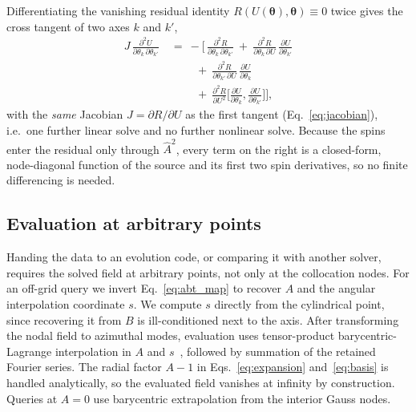 \documentclass[
  aps,
  prd,
  twocolumn,
  10pt,
  amsmath,
  amssymb,
  nofootinbib,
  superscriptaddress,
  floatfix,
]{revtex4-2}
\newcommand{\vect}[1]{\boldsymbol{#1}}
\newcommand{\Ahat}{\hat{A}}
\begin{document}
Differentiating the vanishing residual identity $R(U(\vect{\theta}),\vect{\theta})\equiv0$ twice
gives the cross tangent of two axes $k$ and $k'$,
\begin{equation}
\begin{aligned}
  J\,\frac{\partial^2 U}{\partial\theta_k\,\partial\theta_{k'}} \ &= \ -\bigg[\,
    \frac{\partial^2 R}{\partial\theta_k\,\partial\theta_{k'}}
    \ + \ \frac{\partial^2 R}{\partial\theta_k\,\partial U}\,\frac{\partial U}{\partial\theta_{k'}} \\
  &\qquad \ + \ \frac{\partial^2 R}{\partial\theta_{k'}\,\partial U}\,\frac{\partial U}{\partial\theta_{k}} \\
  &\qquad \ + \ \frac{\partial^2 R}{\partial U^2}\Big[\frac{\partial U}{\partial\theta_k},\frac{\partial U}{\partial\theta_{k'}}\Big]
  \bigg],
\end{aligned}
  \label{eq:cross_tangent}
\end{equation}
with the \emph{same} Jacobian $J=\partial R/\partial U$ as the first tangent
(Eq.~\ref{eq:jacobian}), i.e.\ one further linear solve and no further nonlinear solve.
Because the spins enter the residual only through $\Ahat^2$, every term on the right is a closed-form, node-diagonal
function of the source and its first two spin derivatives, so no finite differencing
is needed.

\subsection{Evaluation at arbitrary points}
\label{sec:solverdetails:eval}

Handing the data to an evolution code, or comparing it with another solver, requires the solved field at arbitrary points, not only at the collocation nodes.
For an off-grid query we invert Eq.~\eqref{eq:abt_map} to recover $A$ and the angular interpolation coordinate $s$.
We compute $s$ directly from the cylindrical point, since recovering it from $B$ is ill-conditioned next to the axis.
After transforming the nodal field to azimuthal modes, evaluation uses tensor-product barycentric-Lagrange interpolation in $A$ and $s$~\cite{Trefethen2019}, followed by summation of the retained Fourier series.
The radial factor $A-1$ in Eqs.~\eqref{eq:expansion} and~\eqref{eq:basis} is handled analytically, so the evaluated field vanishes at infinity by construction.
Queries at $A=0$ use barycentric extrapolation from the interior Gauss nodes.


\end{document}

